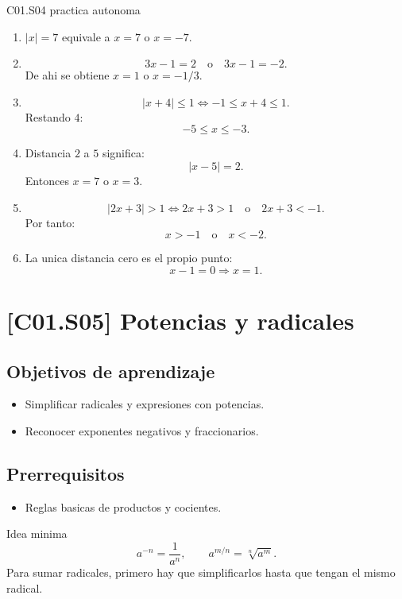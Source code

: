 \begin{fullsolution}{C01.S04 practica autonoma}
\begin{enumerate}[label=\textbf{PX-C01.S04-\arabic*:}, leftmargin=*]
  \item \(|x|=7\) equivale a \(x=7\) o \(x=-7\).
  \item
  \[
  3x-1=2 \quad \text{o} \quad 3x-1=-2.
  \]
  De ahi se obtiene \(x=1\) o \(x=-1/3\).
  \item
  \[
  |x+4|\le 1 \Longleftrightarrow -1\le x+4\le 1.
  \]
  Restando \(4\):
  \[
  -5\le x\le -3.
  \]
  \item Distancia \(2\) a \(5\) significa:
  \[
  |x-5|=2.
  \]
  Entonces \(x=7\) o \(x=3\).
  \item
  \[
  |2x+3|>1 \Longleftrightarrow 2x+3>1 \quad \text{o} \quad 2x+3<-1.
  \]
  Por tanto:
  \[
  x>-1 \quad \text{o} \quad x<-2.
  \]
  \item La unica distancia cero es el propio punto:
  \[
  x-1=0 \Longrightarrow x=1.
  \]
\end{enumerate}
\end{fullsolution}

\section{[C01.S05] Potencias y radicales}

\subsection*{Objetivos de aprendizaje}
\begin{itemize}
  \item Simplificar radicales y expresiones con potencias.
  \item Reconocer exponentes negativos y fraccionarios.
\end{itemize}

\subsection*{Prerrequisitos}
\begin{itemize}
  \item Reglas basicas de productos y cocientes.
\end{itemize}

\begin{theorybox}{Idea minima}
\[
a^{-n}=\frac{1}{a^n},
\qquad
a^{m/n}=\sqrt[n]{a^m}.
\]
Para sumar radicales, primero hay que simplificarlos hasta que tengan el mismo radical.
\end{theorybox}

